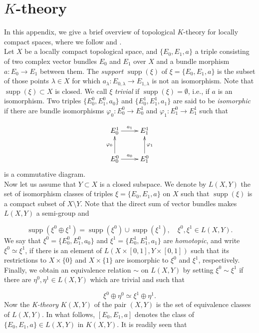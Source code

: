 \documentclass[a4paper,10pt]{article}
\DeclareMathOperator{\supp}{supp}
\begin{document}


\section{$K$-theory}\label{app-K}
In this appendix, we give a brief overview of topological $K$-theory for locally compact spaces, where we follow \cite{Lawson} and \cite{Segal}.\\
Let $X$ be a locally compact topological space, and $\{E_0,E_1,a\}$ a triple consisting of two complex vector bundles $E_0$ and $E_1$ over $X$ and a bundle morphism $a:E_0\rightarrow E_1$ between them. The \textit{support} $\supp(\xi)$ of $\xi=\{E_0,E_1,a\}$ is the subset of those points $\lambda\in X$ for which $a_\lambda:E_{0,\lambda}\rightarrow E_{1,\lambda}$ is not an isomorphism. Note that $\supp(\xi)\subset X$ is closed. We call $\xi$ \textit{trivial} if $\supp(\xi)=\emptyset$, i.e., if $a$ is an isomorphism. Two triples $\{E^0_0,E^0_1,a_0\}$ and $\{E^1_0,E^1_1,a_1\}$ are said to be \textit{isomorphic} if there are bundle isomorphisms $\varphi_0:E^0_0\rightarrow E^1_0$ and $\varphi_1:E^0_1\rightarrow E^1_1$ such that

\begin{align*}
\xymatrix{E^1_0\ar[r]^{a_1}&E^1_1\\
E^0_0\ar[u]^{\varphi_0}\ar[r]^{a_0}&E^0_1\ar[u]_{\varphi_1}
}
\end{align*}  
is a commutative diagram.\\
Now let us assume that $Y\subset X$ is a closed subspace. We denote by $L(X,Y)$ the set of isomorphism classes of triples $\xi=\{E_0,E_1,a\}$ on $X$ such that $\supp(\xi)$ is a compact subset of $X\setminus Y$. Note that the direct sum of vector bundles makes $L(X,Y)$ a semi-group and

\[\supp(\xi^0\oplus \xi^1)=\supp(\xi^0)\cup\supp(\xi^1),\quad \xi^0,\xi^1\in L(X,Y).\]
We say that $\xi^0=\{E^0_0,E^0_1,a_0\}$ and $\xi^1=\{E^1_0,E^1_1,a_1\}$ are \textit{homotopic}, and write $\xi^0\simeq \xi^1$, if there is an element of $L(X\times[0,1],Y\times[0,1])$ such that its restrictions to $X\times\{0\}$ and $X\times\{1\}$ are isomorphic to $\xi^0$ and $\xi^1$, respectively. Finally, we obtain an equivalence relation $\sim$ on $L(X,Y)$ by setting $\xi^0\sim \xi^1$ if there are $\eta^0,\eta^1\in L(X,Y)$ which are trivial and such that 

\[\xi^0\oplus \eta^0\simeq \xi^1\oplus \eta^1.\]
Now the \textit{K-theory} $K(X,Y)$ of the pair $(X,Y)$ is the set of equivalence classes of $L(X,Y)$. In what follows, $[E_0,E_1,a]$ denotes the class of $\{E_0,E_1,a\}\in L(X,Y)$ in $K(X,Y)$. It is readily seen that 
\end{document}
